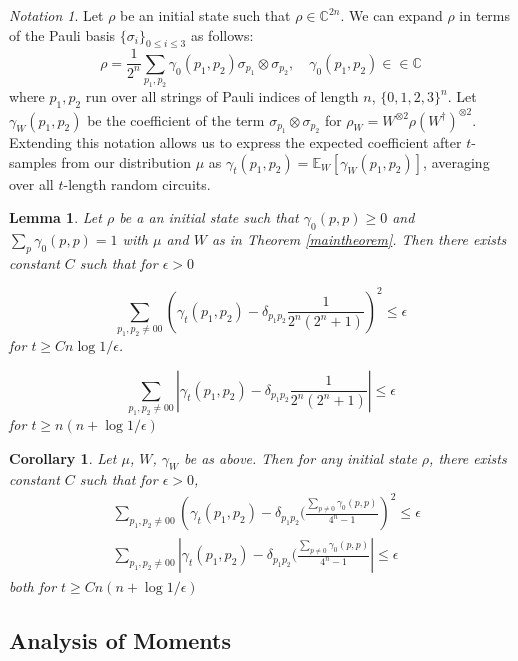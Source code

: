 \documentclass[12pt]{amsart}
\newtheorem{corollary}{Corollary}[theorem]
\newtheorem{lemma}[theorem]{Lemma}
\theoremstyle{definition}
\theoremstyle{remark}
\numberwithin{equation}{section}
\theoremstyle{remark}
\newtheorem{notation}[theorem]{Notation}
\begin{document}
\begin{notation}
  Let $\rho$ be an initial state such that $\rho \in \mathbb{C}^{2n}$. We can expand $\rho$ in terms of the Pauli basis $\{\sigma_i\}_{0 \leq i \leq 3}$ as follows:
  \begin{equation}
    \rho = \frac{1}{2^n} \sum_{p_1,p_2} \gamma_0(p_1,p_2) \sigma_{p_1} \otimes \sigma_{p_2}, \quad \gamma_0(p_1,p_2) \in \in \mathbb{C}
   \end{equation}
  where $p_1,p_2$ run over all strings of Pauli indices of length $n$, $\{0,1,2,3\}^n$. Let $\gamma_W(p_1,p_2)$ be the coefficient of the term $\sigma_{p_1} \otimes \sigma_{p_2}$ for $\rho_W = W^{\otimes 2} \rho (W^\dagger)^{\otimes 2}$. Extending this notation allows us to express the expected coefficient after $t$-samples from our distribution $\mu$ as
  $\gamma_t(p_1,p_2) = \mathbb{E}_W [\gamma_W(p_1,p_2)]$, averaging over all $t$-length random circuits.
\end{notation}
%
\begin{lemma}
  Let $\rho$ be a an initial state such that $\gamma_0(p,p) \geq 0$ and $\sum_{p} \gamma_0(p,p) = 1$ with $\mu$ and $W$ as in Theorem \ref{maintheorem}. Then there exists constant $C$ such that for $\epsilon > 0$

  \begin{equation}
    \sum_{p_1,p_2 \neq 00} \left( \gamma_t(p_1,p_2) - \delta_{p_1p_2} \frac{1}{2^n(2^n + 1)} \right)^2 \leq \epsilon
  \end{equation}
  for $t \geq Cn\log 1/\epsilon$.

  \begin{equation}
    \sum_{p_1,p_2 \neq 00} \left| \gamma_t(p_1,p_2) - \delta_{p_1p_2} \frac{1}{2^n(2^n + 1)} \right| \leq \epsilon
  \end{equation}
  for $t \geq n(n + \log 1/\epsilon)$
\end{lemma}

\begin{corollary}
  Let $\mu$, $W$, $\gamma_W$ be as above. Then for \emph{any} initial state $\rho$, there exists constant $C$ such that for $\epsilon > 0$,
  \begin{align}
    & \sum_{p_1,p_2 \neq 00} \left( \gamma_t(p_1,p_2) - \delta_{p_1p_2}(\frac{\sum_{p\neq 0} \gamma_0(p,p)}{4^n - 1} \right)^2 \leq \epsilon \\
    & \sum_{p_1,p_2 \neq 00} \left| \gamma_t(p_1,p_2) - \delta_{p_1p_2}(\frac{\sum_{p\neq 0} \gamma_0(p,p)}{4^n - 1} \right| \leq \epsilon
  \end{align}
  both for $t \geq Cn(n + \log 1/ \epsilon)$
\end{corollary}

\subsection{Analysis of Moments}

\newpage


\end{document}
